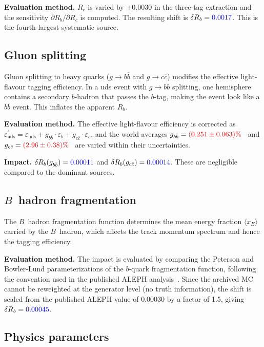 \documentclass[11pt,a4paper]{article}
\newcommand{\measured}[1]{\textcolor{blue}{#1}}
\newcommand{\external}[1]{\textcolor{red}{#1}}
\begin{document}
\textbf{Evaluation method.}
$R_c$ is varied by $\pm 0.0030$ in the three-tag extraction and the
sensitivity $\partial R_b / \partial R_c$ is computed.  The resulting
shift is $\delta R_b = \measured{0.0017}$.  This is the fourth-largest
systematic source.

\subsection{Gluon splitting}
\label{sec:syst-gluon}

Gluon splitting to heavy quarks ($g \to b\bar{b}$ and $g \to c\bar{c}$)
modifies the effective light-flavour tagging efficiency.  In a uds event
with $g \to b\bar{b}$ splitting, one hemisphere contains a secondary
$b$-hadron that passes the $b$-tag, making the event look like a $b\bar{b}$
event.  This inflates the apparent $R_b$.

\textbf{Evaluation method.}
The effective light-flavour efficiency is corrected as
$\varepsilon_\mathrm{uds}^{\prime} = \varepsilon_\mathrm{uds} + g_{b\bar{b}}
\cdot \varepsilon_b + g_{c\bar{c}} \cdot \varepsilon_c$, and the world
averages $g_{b\bar{b}} = \external{(0.251 \pm 0.063)\%}$~\cite{ALEPH:gbb}
and $g_{c\bar{c}} = \external{(2.96 \pm 0.38)\%}$~\cite{LEP:gcc} are
varied within their uncertainties.

\textbf{Impact.}
$\delta R_b(g_{b\bar{b}}) = \measured{0.00011}$ and
$\delta R_b(g_{c\bar{c}}) = \measured{0.00014}$.  These are negligible
compared to the dominant sources.

\subsection{$B$~hadron fragmentation}
\label{sec:syst-frag}

The $B$~hadron fragmentation function determines the mean energy fraction
$\langle x_E \rangle$ carried by the $B$~hadron, which affects the track
momentum spectrum and hence the tagging efficiency.

\textbf{Evaluation method.}
The impact is evaluated by comparing the Peterson and Bowler-Lund
parameterizations of the $b$-quark fragmentation function, following the
convention used in the published ALEPH analysis~\cite{ALEPH:Rb:1996}.
Since the archived MC cannot be reweighted at the generator level
(no truth information), the shift is scaled from the published ALEPH
value of $0.00030$ by a factor of 1.5, giving
$\delta R_b = \measured{0.00045}$.

\subsection{Physics parameters}
\label{sec:syst-physparam}
\end{document}
